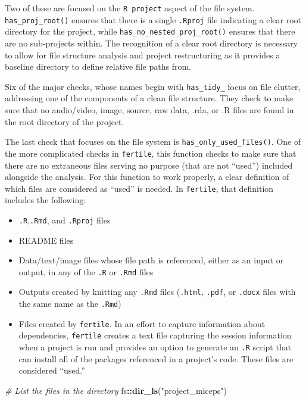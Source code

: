 \documentclass[12pt,twoside]{reedthesis}
\newenvironment{Shaded}{\begin{snugshade}}{\end{snugshade}}
\newcommand{\KeywordTok}[1]{\textcolor[rgb]{0.13,0.29,0.53}{\textbf{#1}}}
\newcommand{\StringTok}[1]{\textcolor[rgb]{0.31,0.60,0.02}{#1}}
\newcommand{\CommentTok}[1]{\textcolor[rgb]{0.56,0.35,0.01}{\textit{#1}}}
\newcommand{\OperatorTok}[1]{\textcolor[rgb]{0.81,0.36,0.00}{\textbf{#1}}}
\newcommand{\NormalTok}[1]{#1}
\providecommand{\tightlist}{%
  \setlength{\itemsep}{0pt}\setlength{\parskip}{0pt}}
\begin{document}
Two of these are focused on the \texttt{R\ project} aspect of the file
system. \texttt{has\_proj\_root()} ensures that there is a single
\texttt{.Rproj} file indicating a clear root directory for the project,
while \texttt{has\_no\_nested\_proj\_root()} ensures that there are no
sub-projects within. The recognition of a clear root directory is
necessary to allow for file structure analysis and project restructuring
as it provides a baseline directory to define relative file paths from.

Six of the major checks, whose names begin with \texttt{has\_tidy\_}
focus on file clutter, addressing one of the components of a clean file
structure. They check to make sure that no audio/video, image, source,
raw data, .rda, or .R files are found in the root directory of the
project.

The last check that focuses on the file system is
\texttt{has\_only\_used\_files()}. One of the more complicated checks in
\texttt{fertile}, this function checks to make sure that there are no
extraneous files serving no purpose (that are not ``used'') included
alongside the analysis. For this function to work properly, a clear
definition of which files are considered as ``used'' is needed. In
\texttt{fertile}, that definition includes the following:
\begin{itemize}
\tightlist
\item
  \texttt{.R},\texttt{.Rmd}, and \texttt{.Rproj} files
\item
  README files
\item
  Data/text/image files whose file path is referenced, either as an
  input or output, in any of the \texttt{.R} or \texttt{.Rmd} files
\item
  Outputs created by knitting any \texttt{.Rmd} files (\texttt{.html},
  \texttt{.pdf}, or \texttt{.docx} files with the same name as the
  \texttt{.Rmd})
\item
  Files created by \texttt{fertile}. In an effort to capture information
  about dependencies, \texttt{fertile} creates a text file capturing the
  session information when a project is run and provides an option to
  generate an \texttt{.R} script that can install all of the packages
  referenced in a project's code. These files are considered ``used.''
\end{itemize}
\footnotesize
\begin{Shaded}
\begin{Highlighting}[]
\CommentTok{# List the files in the directory}
\NormalTok{fs}\OperatorTok{::}\KeywordTok{dir_ls}\NormalTok{(}\StringTok{"project_miceps"}\NormalTok{)}
\end{Highlighting}
\end{Shaded}
\end{document}
